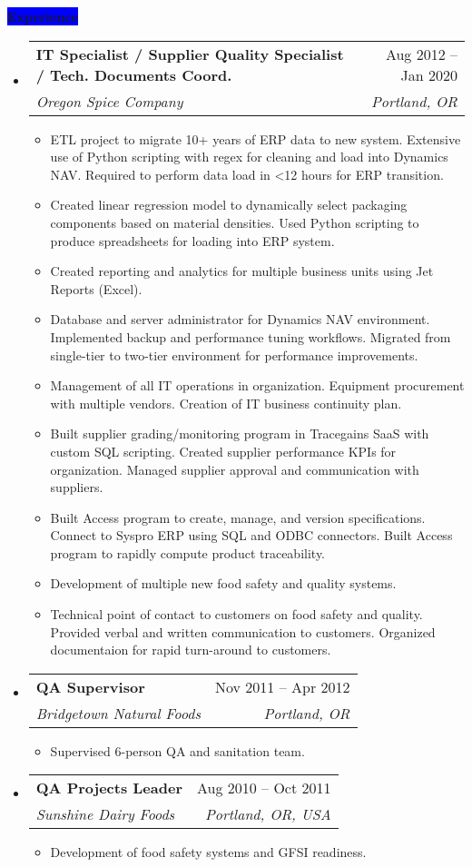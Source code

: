 \documentclass[letterpaper,12pt]{article}[leftmargin=*]
\makeatletter
\def \entryspacing {-0pt}
\newcommand{\experience}[2]{\vspace{6pt}
  \colorbox{Blue}{\color{white}\raggedbottom\normalsize\textbf{{#1}{\hspace{9pt}#2\hspace{4pt}}}}
}
\newcommand{\resumeEntryStart}{\begin{itemize}[leftmargin=2.5mm]}
\newcommand{\resumeEntryEnd}{\end{itemize}\vspace{\entryspacing}}
\newcommand{\resumeItemListStart}{\begin{itemize}[leftmargin=4.5mm]}
\newcommand{\resumeItemListEnd}{\end{itemize}}
\newcommand{\resumeItem}[1]{
  \item\small{
    {#1 \vspace{-2pt}}
  }
}
\newcommand{\resumeEntryTSDL}[4]{
  \vspace{-1pt}\item[]
    \begin{tabularx}{0.97\textwidth}{X@{\hspace{60pt}}r}
      \textbf{\color{primary}#1} & {\firabook\color{accent}\small#2} \\
      \textit{\color{accent}\small#3} & \textit{\color{accent}\small#4} \\
    \end{tabularx}\vspace{-6pt}
}
\makeatother
\begin{document}
\experience{\faPieChart}{Experience}
 \resumeEntryStart
   \resumeEntryTSDL
      {IT Specialist / Supplier Quality Specialist / Tech. Documents Coord.}{Aug 2012 -- Jan 2020}
      {Oregon Spice Company}{Portland, OR}
   \resumeItemListStart
    \resumeItem {ETL project to migrate 10+ years of ERP data to new system. Extensive use of Python scripting with regex for cleaning and load into Dynamics NAV. Required to perform data load in <12 hours for ERP transition.
}
    \resumeItem {Created linear regression model to dynamically select packaging components based on material densities. Used Python scripting to produce spreadsheets for loading into ERP system.}
    \resumeItem {Created reporting and analytics for multiple business units using Jet Reports (Excel).}
    \resumeItem {Database and server administrator for Dynamics NAV environment. Implemented backup and performance tuning workflows. Migrated from single-tier to two-tier environment for performance improvements.}
    \resumeItem {Management of all IT operations in organization. Equipment procurement with multiple vendors. Creation of IT business continuity plan.}
    \resumeItem {Built supplier grading/monitoring program in Tracegains SaaS with custom SQL scripting. Created supplier performance KPIs for organization. Managed supplier approval and communication with suppliers.}
    \resumeItem {Built Access program to create, manage, and version specifications. Connect to Syspro ERP using SQL and ODBC connectors. Built Access program to rapidly compute product traceability.}
    \resumeItem {Development of multiple new food safety and quality systems.}
    \resumeItem {Technical point of contact to customers on food safety and quality. Provided verbal and written communication to customers. Organized documentaion for rapid turn-around to customers.}
  \resumeItemListEnd
 \resumeEntryEnd

  \resumeEntryStart
    \resumeEntryTSDL
      {QA Supervisor}{Nov 2011 -- Apr 2012}
      {Bridgetown Natural Foods}{Portland, OR}
    \resumeItemListStart
      \resumeItem {Supervised 6-person QA and sanitation team.}
    \resumeItemListEnd
  \resumeEntryEnd
  
\pagebreak 

   \resumeEntryStart
    \resumeEntryTSDL
      {QA Projects Leader}{Aug 2010 -- Oct 2011}
      {Sunshine Dairy Foods}{Portland, OR, USA}
    \resumeItemListStart
      \resumeItem {Development of food safety systems and GFSI readiness.}
    \resumeItemListEnd
  \resumeEntryEnd
  
\end{document}
